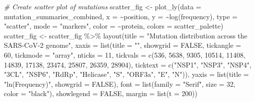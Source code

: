 \documentclass{article}
\newenvironment{Shaded}{\begin{snugshade}}{\end{snugshade}}
\newcommand{\AttributeTok}[1]{\textcolor[rgb]{0.77,0.63,0.00}{#1}}
\newcommand{\CommentTok}[1]{\textcolor[rgb]{0.56,0.35,0.01}{\textit{#1}}}
\newcommand{\ConstantTok}[1]{\textcolor[rgb]{0.00,0.00,0.00}{#1}}
\newcommand{\DecValTok}[1]{\textcolor[rgb]{0.00,0.00,0.81}{#1}}
\newcommand{\FunctionTok}[1]{\textcolor[rgb]{0.00,0.00,0.00}{#1}}
\newcommand{\NormalTok}[1]{#1}
\newcommand{\OtherTok}[1]{\textcolor[rgb]{0.56,0.35,0.01}{#1}}
\newcommand{\SpecialCharTok}[1]{\textcolor[rgb]{0.00,0.00,0.00}{#1}}
\newcommand{\StringTok}[1]{\textcolor[rgb]{0.31,0.60,0.02}{#1}}
\begin{document}
\begin{Shaded}
\begin{Highlighting}[]
\CommentTok{\# Create scatter plot of mutations}
\NormalTok{scatter\_fig }\OtherTok{\textless{}{-}} \FunctionTok{plot\_ly}\NormalTok{(}\AttributeTok{data =}\NormalTok{ mutation\_summaries\_combined, }\AttributeTok{x =} \SpecialCharTok{\textasciitilde{}}\NormalTok{position, }\AttributeTok{y =} \SpecialCharTok{\textasciitilde{}}\FunctionTok{log}\NormalTok{(frequency),}
    \AttributeTok{type =} \StringTok{"scatter"}\NormalTok{, }\AttributeTok{mode =} \StringTok{"markers"}\NormalTok{, }\AttributeTok{color =} \SpecialCharTok{\textasciitilde{}}\NormalTok{protein, }\AttributeTok{colors =}\NormalTok{ scatter\_palette)}
\NormalTok{scatter\_fig }\OtherTok{\textless{}{-}}\NormalTok{ scatter\_fig }\SpecialCharTok{\%\textgreater{}\%}
    \FunctionTok{layout}\NormalTok{(}\AttributeTok{title =} \StringTok{"Mutation distribution across the SARS{-}CoV{-}2 genome"}\NormalTok{, }\AttributeTok{xaxis =} \FunctionTok{list}\NormalTok{(}\AttributeTok{title =} \StringTok{""}\NormalTok{,}
        \AttributeTok{showgrid =} \ConstantTok{FALSE}\NormalTok{, }\AttributeTok{tickangle =} \DecValTok{60}\NormalTok{, }\AttributeTok{tickmode =} \StringTok{"array"}\NormalTok{, }\AttributeTok{nticks =} \DecValTok{11}\NormalTok{, }\AttributeTok{tickvals =} \FunctionTok{c}\NormalTok{(}\DecValTok{536}\NormalTok{,}
            \DecValTok{5638}\NormalTok{, }\DecValTok{9305}\NormalTok{, }\DecValTok{10514}\NormalTok{, }\DecValTok{11408}\NormalTok{, }\DecValTok{14839}\NormalTok{, }\DecValTok{17138}\NormalTok{, }\DecValTok{23474}\NormalTok{, }\DecValTok{25807}\NormalTok{, }\DecValTok{26359}\NormalTok{, }\DecValTok{28904}\NormalTok{),}
        \AttributeTok{ticktext =} \FunctionTok{c}\NormalTok{(}\StringTok{"NSP1"}\NormalTok{, }\StringTok{"NSP3"}\NormalTok{, }\StringTok{"NSP4"}\NormalTok{, }\StringTok{"3CL"}\NormalTok{, }\StringTok{"NSP6"}\NormalTok{, }\StringTok{"RdRp"}\NormalTok{, }\StringTok{"Helicase"}\NormalTok{, }\StringTok{"S"}\NormalTok{,}
            \StringTok{"ORF3a"}\NormalTok{, }\StringTok{"E"}\NormalTok{, }\StringTok{"N"}\NormalTok{)), }\AttributeTok{yaxis =} \FunctionTok{list}\NormalTok{(}\AttributeTok{title =} \StringTok{"ln(Frequency)"}\NormalTok{, }\AttributeTok{showgrid =} \ConstantTok{FALSE}\NormalTok{),}
        \AttributeTok{font =} \FunctionTok{list}\NormalTok{(}\AttributeTok{family =} \StringTok{"Serif"}\NormalTok{, }\AttributeTok{size =} \DecValTok{32}\NormalTok{, }\AttributeTok{color =} \StringTok{"black"}\NormalTok{), }\AttributeTok{showlegend =} \ConstantTok{FALSE}\NormalTok{,}
        \AttributeTok{margin =} \FunctionTok{list}\NormalTok{(}\AttributeTok{t =} \DecValTok{200}\NormalTok{))}

\end{Highlighting}
\end{Shaded}
\end{document}
